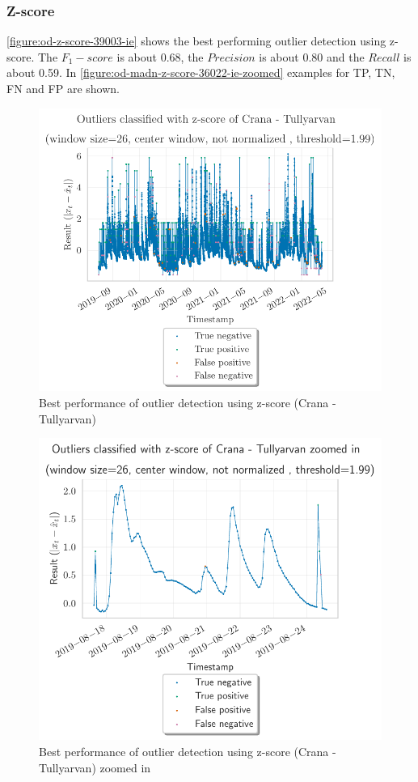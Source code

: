 \subsubsection{Z-score}
\autoref{figure:od-z-score-39003-ie} shows the best performing outlier detection using z-score. The $F_1-score$ is about 0.68, the $Precision$ is about 0.80 and the $Recall$ is about 0.59. In \autoref{figure:od-madn-z-score-36022-ie-zoomed} examples for \ac{TP}, \ac{TN}, \ac{FN} and \ac{FP} are shown.
\begin{figure}[H]
    \centering 
    \includegraphics{plots/pdfs/39003-ie/od_z-score_39003-ie_all.pdf}
    \caption{Best performance of outlier detection using z-score (Crana - Tullyarvan)}
    \label{figure:od-z-score-39003-ie}
\end{figure}
\begin{figure}[H]
    \centering 
    \includegraphics{plots/pdfs/39003-ie/od_z-score_39003-ie_zoomed.pdf}
    \caption{Best performance of outlier detection using z-score (Crana - Tullyarvan) zoomed in}
    \label{figure:od-z-score-39003-ie-zoomed}
\end{figure}
\clearpage
